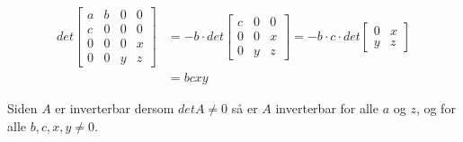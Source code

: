 \documentclass[11pt, a4paper, norsk]{NTNUoving}
\begin{document}
\begin{oppgave}[3]
    \begin{punkt}
        \begin{align*}
            det\begin{bmatrix}
            a & b & 0 & 0\\
            c & 0 & 0 & 0\\
            0 & 0 & 0 & x\\
            0 & 0 & y & z
            \end{bmatrix}
            &=-b\cdot det\begin{bmatrix}
            c  & 0 & 0\\
            0  & 0 & x\\
            0  & y & z
            \end{bmatrix}
            =-b\cdot c\cdot det\begin{bmatrix}
            0 & x\\
             y & z
            \end{bmatrix}
            \\&=bcxy
        \end{align*}
    \end{punkt}
    \begin{punkt}
        Siden $A$ er inverterbar dersom $detA \neq 0$ så er $A$ inverterbar for alle $a$ og $z$, og for alle $b, c, x, y \neq0$.
    \end{punkt}
\end{oppgave}
\end{document}
